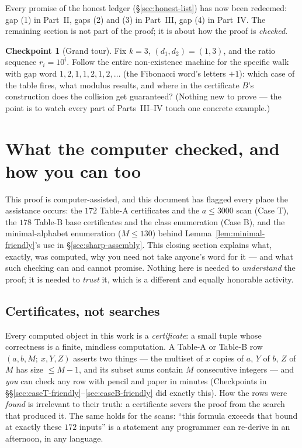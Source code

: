 \documentclass[11pt,reqno]{amsart}
\theoremstyle{plain}
\theoremstyle{definition}
\newtheorem{checkpoint}[theorem]{Checkpoint}   %
\theoremstyle{remark}
\begin{document}
Every promise of the honest ledger (\S\ref{sec:honest-list}) has now been
redeemed: gap (1) in Part~II, gaps (2) and (3) in Part~III, gap (4) in Part~IV.
The remaining section is not part of the proof; it is about how the proof is
\emph{checked}.

\begin{checkpoint}[Grand tour]
Fix $k = 3$, $(d_1, d_2) = (1, 3)$, and the ratio sequence $r_i = 10^i$. Follow
the entire non-existence machine for the specific walk with gap word
$1,2,1,1,2,1,2,\dots$ (the Fibonacci word's letters $+1$): which case of the
table fires, what modulus results, and where in the certificate $B$'s
construction does the collision get guaranteed? (Nothing new to prove --- the
point is to watch every part of Parts~III--IV touch one concrete example.)
\end{checkpoint}


\section{What the computer checked, and how you can too}\label{sec:computer}

This proof is computer-assisted, and this document has flagged every place the
assistance occurs: the $172$ Table-A certificates and the $a \le 3000$ scan
(Case T), the $178$ Table-B base certificates and the class enumeration (Case
B), and the minimal-alphabet enumeration ($M \le 130$) behind
Lemma~\ref{lem:minimal-friendly}'s use in \S\ref{sec:sharp-assembly}. This
closing section explains what, exactly, was computed, why you need not take
anyone's word for it --- and what such checking can and cannot promise. Nothing
here is needed to \emph{understand} the proof; it is needed to \emph{trust} it,
which is a different and equally honorable activity.

\subsection{Certificates, not searches}

Every computed object in this work is a \emph{certificate}: a small tuple whose
correctness is a finite, mindless computation. A Table-A or Table-B row
$(a, b, M;\ x, Y, Z)$ asserts two things --- the multiset of $x$ copies of $a$,
$Y$ of $b$, $Z$ of $M$ has size $\le M - 1$, and its subset sums contain $M$
consecutive integers --- and \emph{you} can check any row with pencil and paper
in minutes (Checkpoints in \S\S\ref{sec:caseT-friendly}--\ref{sec:caseB-friendly}
did exactly this). How the rows were \emph{found} is irrelevant to their truth:
a certificate severs the proof from the search that produced it. The same holds
for the scans: ``this formula exceeds that bound at exactly these $172$ inputs''
is a statement any programmer can re-derive in an afternoon, in any language.
\end{document}
